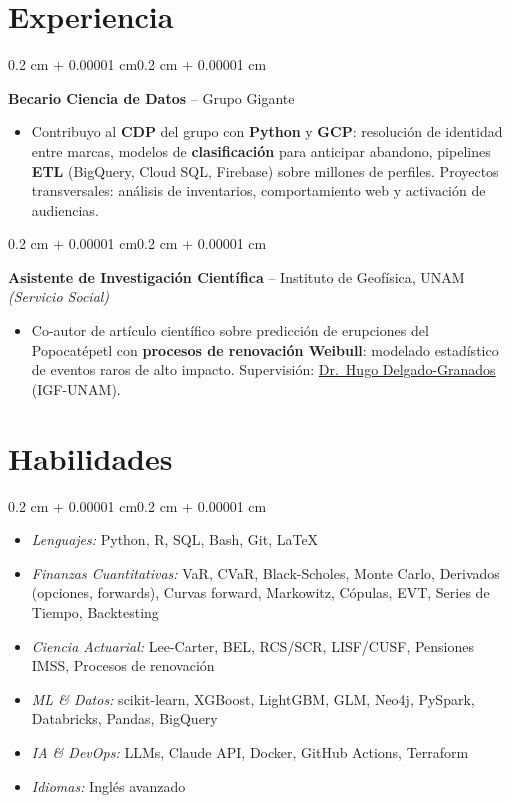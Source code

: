 \documentclass[10pt, letterpaper]{article}
\newenvironment{highlights}{
    \begin{itemize}[topsep=0.02 cm,parsep=0.05 cm,partopsep=0pt,itemsep=0pt,leftmargin=0.4 cm + 10pt]
}{\end{itemize}}
\newenvironment{highlightsforbulletentries}{
    \begin{itemize}[topsep=0.02 cm,parsep=0.02 cm,partopsep=0pt,itemsep=0pt,leftmargin=10pt]
}{\end{itemize}}
\newenvironment{onecolentry}{
    \begin{adjustwidth}{0.2 cm + 0.00001 cm}{0.2 cm + 0.00001 cm}
}{\end{adjustwidth}}
\let\hrefWithoutArrow\href
\renewcommand{\href}[2]{\hrefWithoutArrow{#1}{\ifthenelse{\equal{#2}{}}{ }{#2 }\raisebox{.15ex}{\footnotesize \faExternalLink*}}}
\begin{document}
    \section{Experiencia}
        \begin{onecolentry}
            \textbf{Becario Ciencia de Datos} -- Grupo Gigante
            \begin{highlights}
                \item Contribuyo al \textbf{CDP} del grupo con \textbf{Python} y \textbf{GCP}: resolución de identidad entre marcas, modelos de \textbf{clasificación} para anticipar abandono, pipelines \textbf{ETL} (BigQuery, Cloud SQL, Firebase) sobre millones de perfiles. Proyectos transversales: análisis de inventarios, comportamiento web y activación de audiencias.
            \end{highlights}
            \end{onecolentry}

        \vspace{0.02 cm}

        \begin{onecolentry}
            \textbf{Asistente de Investigación Científica} -- Instituto de Geofísica, UNAM \textit{(Servicio Social)}
            \begin{highlights}
                \item Co-autor de artículo científico sobre predicción de erupciones del Popocatépetl con \textbf{procesos de renovación Weibull}: modelado estadístico de eventos raros de alto impacto. Supervisión: \hrefWithoutArrow{https://scholar.google.com/citations?user=lDD0DZQAAAAJ}{Dr.\ Hugo Delgado-Granados} (IGF-UNAM).
            \end{highlights}
            \end{onecolentry}

    \section{Habilidades}
\begin{onecolentry}
    \begin{highlightsforbulletentries}
        \item \textit{Lenguajes:} Python, R, SQL, Bash, Git, \LaTeX
        \item \textit{Finanzas Cuantitativas:} VaR, CVaR, Black-Scholes, Monte Carlo, Derivados (opciones, forwards), Curvas forward, Markowitz, Cópulas, EVT, Series de Tiempo, Backtesting
        \item \textit{Ciencia Actuarial:} Lee-Carter, BEL, RCS/SCR, LISF/CUSF, Pensiones IMSS, Procesos de renovación
        \item \textit{ML \& Datos:} scikit-learn, XGBoost, LightGBM, GLM, Neo4j, PySpark, Databricks, Pandas, BigQuery
        \item \textit{IA \& DevOps:} LLMs, Claude API, Docker, GitHub Actions, Terraform
        \item \textit{Idiomas:} Inglés avanzado
    \end{highlightsforbulletentries}
\end{onecolentry}
\end{document}

